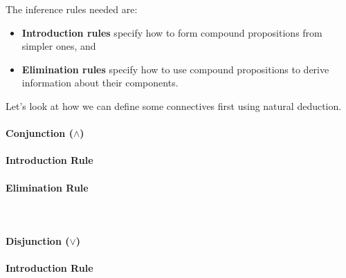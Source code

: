 The inference rules needed are:
\begin{itemize}
  \item \textbf{Introduction rules} specify how to form compound propositions from simpler ones, and
  \item \textbf{Elimination rules} specify how to use compound propositions to derive information about their components.
\end{itemize}
Let's look at how we can define some connectives first using natural deduction.
\paragraph{Conjunction ($\land$)}
\paragraph{Introduction Rule}
\begin{prooftree}
\end{prooftree}
\paragraph{Elimination Rule}
\mbox{}\\[0.5em]
\noindent
\begin{minipage}[t]{0.48\textwidth}
  \vspace{0pt}
  \begin{prooftree}
  \end{prooftree}
\end{minipage}\hfill
\begin{minipage}[t]{0.48\textwidth}
  \vspace{0pt}
  \begin{prooftree}
  \end{prooftree}
\end{minipage}
\paragraph{Disjunction ($\lor$)}
\paragraph{Introduction Rule}
\mbox{}\\[0.5em]
\noindent
\begin{minipage}[t]{0.48\textwidth}
  \vspace{0pt}
  \begin{prooftree}
  \end{prooftree}
\end{minipage}\hfill
\begin{minipage}[t]{0.48\textwidth}
  \vspace{0pt}
  \begin{prooftree}
  \end{prooftree}
\end{minipage}
